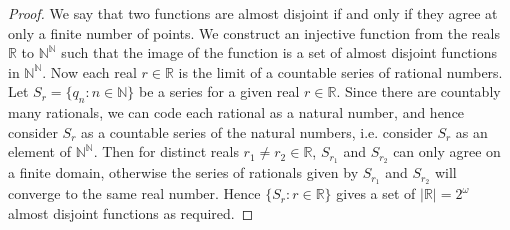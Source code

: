 \documentclass{article}
\begin{document}
\begin{enumerate}[label={\bf Q\arabic*:}]
\begin{enumerate}
        \begin{proof}
          We say that two functions are almost disjoint if and only if they
          agree at only a finite number of points. We construct an
          injective function from the reals $\mathbb{R}$ to
          $\mathbb{N}^\mathbb{N}$ such that the image of the function is a
          set of almost disjoint functions in $\mathbb{N}^\mathbb{N}$. Now
          each real $r\in\mathbb{R}$ is the limit of a countable series of
          rational numbers. Let $S_r=\{q_n:n\in\mathbb{N}\}$ be a series
          for a given real $r\in\mathbb{R}$. Since there are countably many
          rationals, we can code each rational as a natural number, and
          hence consider $S_r$ as a countable series of the natural
          numbers, i.e.  consider $S_r$ as an element of
          $\mathbb{N}^\mathbb{N}$. Then for distinct reals $r_1\neq
          r_2\in\mathbb{R}$, $S_{r_1}$ and $S_{r_2}$ can only agree on a
          finite domain, otherwise the series of rationals given by
          $S_{r_1}$ and $S_{r_2}$ will converge to the same real number.
          Hence $\{S_r: r\in\mathbb{R}\}$ gives a set of
          $|\mathbb{R}|=2^\omega$ almost disjoint functions as required.





\end{proof}
\end{enumerate}
\end{enumerate}
\end{document}
